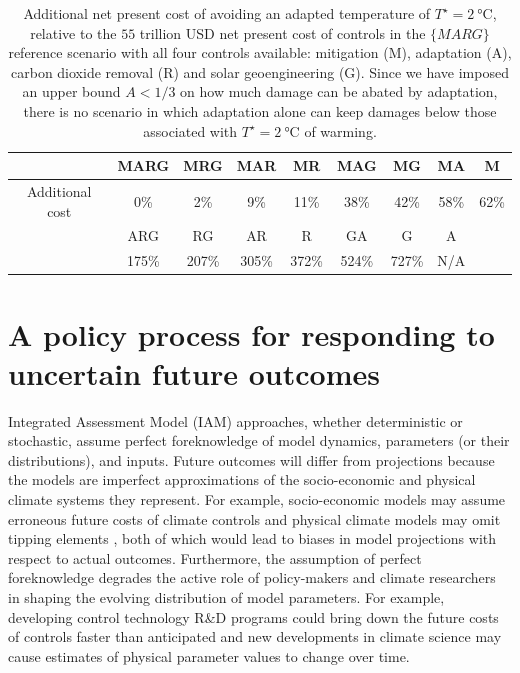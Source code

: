 \documentclass{article}
\begin{document}
\begin{table}[t]
\begin{center}
 \begin{tabular}{|| c || c | c | c | c | c | c | c | c ||}
 \hline
 & MARG & MRG & MAR & MR & MAG & MG & MA & M \\ [0.5ex] 
 \hline
 Additional cost &
 0\% &
 2\% &
 9\% &
 11\% &
 38\% &
 42\% &
 58\% &
 62\%
 \\
 \hline\hline\hline
 & ARG & RG & AR & R & GA & G & A & \\
 \hline
 &
 175\% &
 207\% &
 305\% &
 372\% &
 524\% &
 727\% &
 N/A &
 \\
 \hline
 \end{tabular}
\end{center}
\caption{Additional net present cost of avoiding an adapted temperature of $T^{\star}=\SI{2}{\celsius}$, relative to the $55$ trillion USD net present cost of controls in the $\{MARG\}$ reference scenario with all four controls available: mitigation (M), adaptation (A), carbon dioxide removal (R) and solar geoengineering (G). Since we have imposed an upper bound $A<1/3$ on how much damage can be abated by adaptation, there is no scenario in which adaptation alone can keep damages below those associated with $T^{\star} = \SI{2}{\celsius}$ of warming.}
\label{tab.relative_control_costs}
\end{table}

\section{A policy process for responding to uncertain future outcomes}\label{sec.reactive}

Integrated Assessment Model (IAM) approaches, whether deterministic or stochastic, assume perfect foreknowledge of model dynamics, parameters (or their distributions), and inputs. Future outcomes will differ from projections because the models are imperfect approximations of the socio-economic and physical climate systems they represent. For example, socio-economic models may assume erroneous future costs of climate controls and physical climate models may omit tipping elements \citep{steffen_trajectories_2018}, both of which would lead to biases in model projections with respect to actual outcomes. Furthermore, the assumption of perfect foreknowledge degrades the active role of policy-makers and climate researchers in shaping the evolving distribution of model parameters. For example, developing control technology R\&D programs could bring down the future costs of controls faster than anticipated and new developments in climate science may cause estimates of physical parameter values to change over time.
\end{document}
